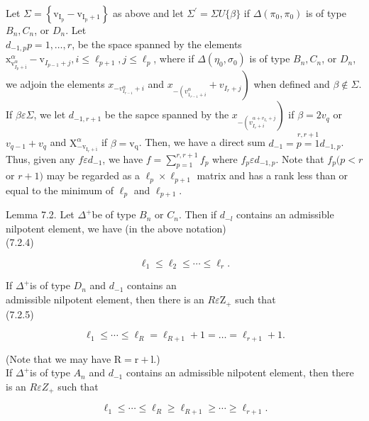 \documentclass[10pt]{article}
\begin{document}
Let $\Sigma=\left\{\mathrm{v}_{\mathrm{I}_{\mathrm{p}}}-\mathrm{v}_{\mathrm{I}_{\mathrm{p}}+1}\right\}$ as above and let $\Sigma^{\prime}=\Sigma U\{\beta\}$ if $\Delta\left(\pi_{0}, \pi_{0}\right)$ is of type $B_{n}, C_{n}$, or $D_{n}$. Let\\
$d_{-1, p} p=1, \ldots, r$, be the space spanned by the elements $\mathrm{x}_{\mathrm{v}_{I_{p}+\mathrm{i}}^{\alpha}}^{\alpha}-\mathrm{v}_{I_{p-1}+j}, i \leq \ell_{p+1}, j \leq \ell_{p}$, where if $\Delta\left(\eta_{0}, \sigma_{0}\right)$ is of type $B_{n}, C_{n}$, or $D_{n}$, we adjoin the elements $x_{-v_{I_{r-1}}^{\alpha}+i}$ and $\left.x_{-\left(v_{1_{r-1}+i}^{\alpha}\right.}+v_{I_{r}+j}\right)$ when defined and $\beta \notin \Sigma$. If $\beta \varepsilon \Sigma$, we let $d_{-1, r+1}$ be the sapce spanned by the $\left.x_{-\left(v_{I_{r}+i}^{\alpha+v_{I_{r}}+j}\right.}\right)$ if $\beta=2 v_{q}$ or $v_{q-1}+v_{q}$ and $\mathrm{X}_{-\mathrm{v}_{\mathrm{I}_{r}+\mathrm{i}}}^{\alpha}$ if $\beta=\mathrm{v}_{\mathrm{q}}$. Then, we have a direct sum $d_{-1}=\stackrel{r, r+1}{p=1} d_{-1, p}$. Thus, given any $f \varepsilon d_{-1}$, we have $f=\sum_{p=1}^{r, r+1} f_{p}$ where $f_{p} \varepsilon d_{-1, p}$. Note that $f_{p}(p<r$ or $r+1)$ may be regarded as a $\ell_{p} \times \ell_{p+1}$ matrix and has a rank less than or equal to the minimum of $\ell_{p}$ and $\ell_{p+1}$.

Lemma 7.2. Let $\Delta^{+}$be of type $B_{n}$ or $C_{n}$. Then if $d_{-l}$ contains an admissible nilpotent element, we have (in the above notation)\\
(7.2.4)

$$
\ell_{1} \leq \ell_{2} \leq \cdots \leq \ell_{r} .
$$

If $\Delta^{+}$is of type $D_{n}$ and $d_{-1}$ contains an\\
admissible nilpotent element, then there is an $R \varepsilon \mathrm{Z}_{+}$ such that\\
(7.2.5)

$$
\ell_{1} \leq \cdots \leq \ell_{R}=\ell_{R+1}+1=\ldots=\ell_{r+1}+1 .
$$

(Note that we may have $\mathrm{R}=\mathrm{r}+\mathrm{l}$.)\\
If $\Delta^{+}$is of type $A_{n}$ and $d_{-1}$ contains an admissible nilpotent element, then there is an $R \varepsilon Z_{+}$ such that


\begin{equation*}
\ell_{1} \leq \cdots \leq \ell_{R} \geq \ell_{R+1} \geq \cdots \geq \ell_{r+1} . \tag{7.2.6}
\end{equation*}
\end{document}

